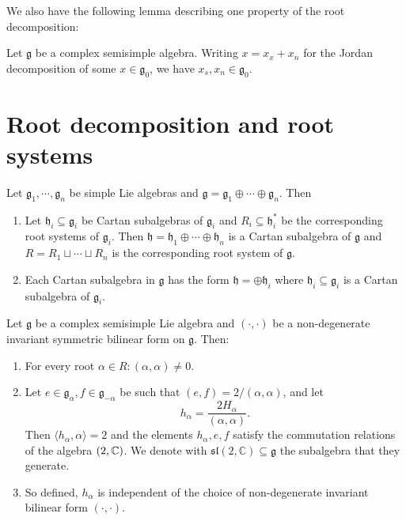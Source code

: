 \documentclass{report}
\begin{document}
We also have the following lemma describing one property of the root decomposition:
\begin{lemma}
    Let $\mathfrak g $ be a complex semisimple algebra.
    Writing $x = x_x + x_n$ for the Jordan decomposition of some $x \in \mathfrak g_0$, we have $x_s, x_n \in \mathfrak g_0$.
\end{lemma}

\section{Root decomposition and root systems}

\begin{theorem}\label{thm:cartan_subalgebras_of_semisimple_algebras}
    Let $\mathfrak g_1, \cdots, \mathfrak g_n$ be simple Lie algebras and $\mathfrak g = \mathfrak g_1 \oplus \cdots \oplus \mathfrak g_n$.
    Then
    \begin{enumerate}[label = (\roman*)]
        \item Let $\mathfrak h_i \subseteq \mathfrak g_i$ be Cartan subalgebras of $\mathfrak g_i$ and $R_i \subseteq \mathfrak h_i^*$ be the corresponding root systems of $\mathfrak g_i$.
        Then $\mathfrak h = \mathfrak h_1 \oplus \cdots \oplus \mathfrak h_n$ is a Cartan subalgebra of $\mathfrak g$ and $R = R_1 \sqcup \cdots \sqcup R_n$ is the corresponding root system of $\mathfrak g$.
        \item Each Cartan subalgebra in $\mathfrak g$ has the form $\mathfrak h = \oplus \mathfrak h_i$ where $\mathfrak h_i \subseteq \mathfrak g_i$ is a Cartan subalgebra of $\mathfrak g_i$. 
    \end{enumerate}
\end{theorem}

\begin{lemma}
    Let $\mathfrak g$ be a complex semisimple Lie algebra and $(\cdot, \cdot)$ be a non-degenerate invariant symmetric bilinear form on $\mathfrak g$.
    Then:
    \begin{enumerate}[label = (\roman*)]
        \item For every root $\alpha \in R: (\alpha, \alpha) \neq 0$.
        \item Let $e \in \mathfrak g_\alpha, f \in \mathfrak g_{-\alpha}$ be such that $(e, f) = 2/(\alpha, \alpha)$, and let 
        \[
        h_\alpha = \frac{2 H_\alpha}{(\alpha, \alpha)}.
        \]
        Then $\langle h_\alpha, \alpha \rangle = 2$ and the elements $h_\alpha, e, f$ satisfy the commutation relations of the algebra $\sl(2, \mathbb C)$.
        We denote with $\mathfrak{sl}(2, \mathbb C) \subseteq \mathfrak g$ the subalgebra that they generate.
        \item So defined, $h_\alpha$ is independent of the choice of non-degenerate invariant bilinear form $(\cdot, \cdot)$.
    \end{enumerate}
\end{lemma}
\end{document}
